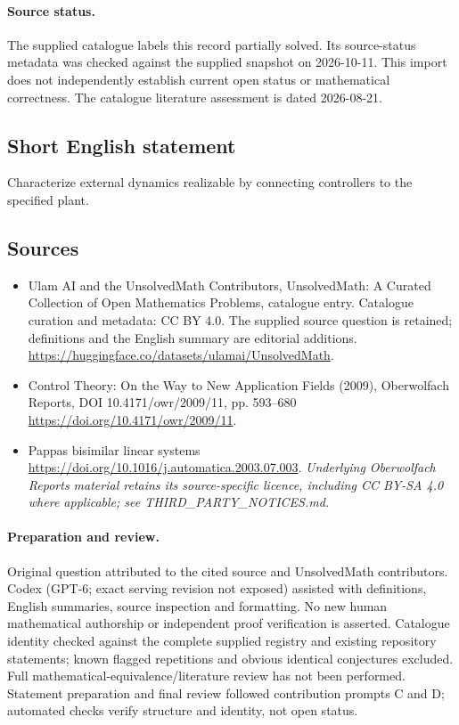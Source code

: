 \documentclass[11pt]{article}
\begin{document}
\paragraph{Source status.}
The supplied catalogue labels this record partially solved. Its source-status metadata was checked against the supplied snapshot on 2026-10-11. This import does not independently establish current open status or mathematical correctness. The catalogue literature assessment is dated 2026-08-21.
\subsection{Short English statement}
Characterize external dynamics realizable by connecting controllers to the specified plant.
\subsection{Sources}
\begin{itemize}
\item[S1] Ulam AI and the UnsolvedMath Contributors, UnsolvedMath: A Curated Collection of Open Mathematics Problems, catalogue entry. Catalogue curation and metadata: CC BY 4.0. The supplied source question is retained; definitions and the English summary are editorial additions.
\url{https://huggingface.co/datasets/ulamai/UnsolvedMath}.
\item[S2] Control Theory: On the Way to New Application Fields (2009), Oberwolfach Reports, DOI 10.4171/owr/2009/11, pp. 593--680
\url{https://doi.org/10.4171/owr/2009/11}.
\item[S3] Pappas bisimilar linear systems
\url{https://doi.org/10.1016/j.automatica.2003.07.003}.
\textit{Underlying Oberwolfach Reports material retains its source-specific licence, including CC BY-SA 4.0 where applicable; see THIRD\_PARTY\_NOTICES.md.}
\end{itemize}
\paragraph{Preparation and review.}
Original question attributed to the cited source and UnsolvedMath contributors. Codex (GPT-6; exact serving revision not exposed) assisted with definitions, English summaries, source inspection and formatting. No new human mathematical authorship or independent proof verification is asserted. Catalogue identity checked against the complete supplied registry and existing repository statements; known flagged repetitions and obvious identical conjectures excluded. Full mathematical-equivalence/literature review has not been performed. Statement preparation and final review followed contribution prompts C and D; automated checks verify structure and identity, not open status.
\label{end:statement}
\end{document}
